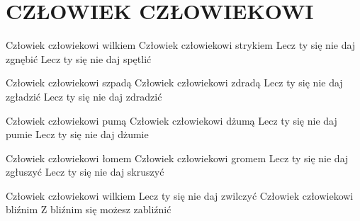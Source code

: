 \documentclass[../../../songbook.tex]{subfiles}
\begin{document}
\TabPositions{8cm} %
\section*{CZŁOWIEK CZŁOWIEKOWI}
\vspace{0.5cm}

Człowiek człowiekowi wilkiem 	 \newline
Człowiek człowiekowi strykiem 	 \newline
Lecz ty się nie daj zgnębić		\newline
Lecz ty się nie daj spętlić		\newline

\-\hspace{1cm} Człowiek człowiekowi szpadą	\newline
\-\hspace{1cm} Człowiek człowiekowi zdradą	\newline
\-\hspace{1cm} Lecz ty się nie daj zgładzić	\newline
\-\hspace{1cm} Lecz ty się nie daj zdradzić	\newline

Człowiek człowiekowi pumą 		 \newline
Człowiek człowiekowi dżumą 		 \newline
Lecz ty się nie daj pumie		\newline
Lecz ty się nie daj dżumie		\newline

\-\hspace{1cm} Człowiek człowiekowi łomem	\newline
\-\hspace{1cm} Człowiek człowiekowi gromem	\newline
\-\hspace{1cm} Lecz ty się nie daj zgłuszyć	\newline
\-\hspace{1cm} Lecz ty się nie daj skruszyć	\newline

Człowiek człowiekowi wilkiem		 \newline
Lecz ty się nie daj zwilczyć 		 \newline
Człowiek człowiekowi bliźnim 		 \newline
Z bliźnim się możesz zabliźnić 		 \newline
\end{document}
